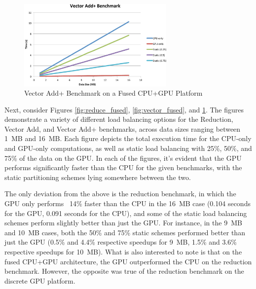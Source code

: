 \documentclass[journal]{IEEEtran}
\begin{document}
\begin{figure}[t]
\centering
\includegraphics[width=3.0in]{vector_plus_fused}
\caption{Vector Add+ Benchmark on a Fused CPU+GPU Platform}
\label{fig:vector_plus_fused}
\end{figure}

Next, consider Figures \ref{fig:reduce_fused}, \ref{fig:vector_fused}, and
\ref{fig:vector_plus_fused}. The figures demonstrate a variety of different
load balancing options for the Reduction, Vector Add, and Vector Add+
benchmarks, across data sizes ranging between 1~MB and 16~MB.  Each figure
depicts the total execution time for the CPU-only and GPU-only computations,
as well as static load balancing with 25\%, 50\%, and 75\% of the data on the
GPU.  In each of the figures, it's evident that the GPU performs significantly
faster than the CPU for the given benchmarks, with the static partitioning
schemes lying somewhere between the two.

The only deviation from the above is the reduction benchmark, in which the GPU
only performs ~14\% faster than the CPU in the 16~MB case (0.104 seconds for the
GPU, 0.091 seconds for the CPU), and some of the static load balancing schemes
perform slightly better than just the GPU.  For instance, in the 9~MB and 10~MB
cases, both the 50\% and 75\% static schemes performed better than just the GPU
(0.5\% and 4.4\% respective speedups for 9~MB, 1.5\% and 3.6\% respective speedups
for 10~MB). What is also interested to note is that on the fused CPU+GPU architecture,
the GPU outperformed the CPU on the reduction benchmark.  However, the opposite was
true of the reduction benchmark on the discrete GPU platform.


\end{document}
